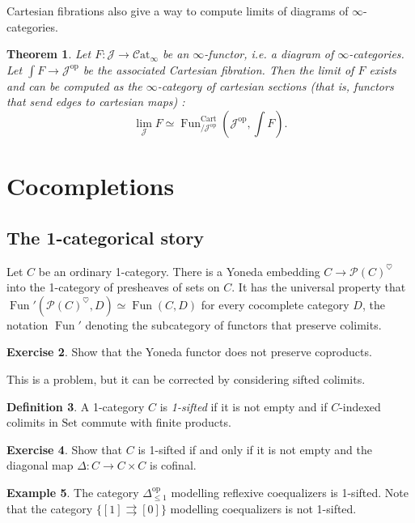 \documentclass[11pt]{article}
\newtheorem{theorem}{Theorem}[section]
\theoremstyle{definition}
\newtheorem{definition}[theorem]{Definition}
\newtheorem{example}[theorem]{Example}
\newtheorem{exercise}[theorem]{Exercise}
\newcommand{\Catinf}{\mathcal{C}\mathrm{at}_{\infty}}
\newcommand{\Fun}{\operatorname{Fun}}
\newcommand{\heart}{\heartsuit}
\newcommand{\J}{\mathcal{J}}
\newcommand{\op}{\mathrm{op}}
\renewcommand{\P}{\mathcal{P}}
\newcommand{\Set}{\mathrm{Set}}
\begin{document}
Cartesian fibrations also give a way to compute limits of diagrams of $\infty$-categories.
\begin{theorem}
    Let $F : \J \to \Catinf$ be an $\infty$-functor, i.e. a diagram of $\infty$-categories.
    Let $\int F \to \J^{\op}$ be the associated Cartesian fibration.
    Then the limit of $F$ exists and can be computed as the $\infty$-category of cartesian sections (that is, functors that send edges to cartesian maps) :
    \[
        \lim_{\J} F \simeq \Fun_{/\J^{\op}}^{\mathrm{Cart}}(\J^{\op}, \int F).
    \]
\end{theorem}

\section{Cocompletions}

\subsection{The 1-categorical story}

Let $C$ be an ordinary 1-category.
There is a Yoneda embedding $C \to \P(C)^{\heart}$ into the 1-category of presheaves of sets on $C$.
It has the universal property that $\Fun'(\P(C)^{\heart}, D) \simeq \Fun(C, D)$ for every cocomplete category $D$, the notation $\Fun'$ denoting the subcategory of functors that preserve colimits.

\begin{exercise}
    Show that the Yoneda functor does not preserve coproducts.
\end{exercise}

This is a problem, but it can be corrected by considering sifted colimits.
\begin{definition}
    A 1-category $C$ is \emph{1-sifted} if it is not empty and if $C$-indexed colimits in $\Set$ commute with finite products.
\end{definition}

\begin{exercise}
    Show that $C$ is 1-sifted if and only if it is not empty and the diagonal map $\Delta : C \to C \times C$ is cofinal.
\end{exercise}

\begin{example}
    The category $\Delta^{\op}_{\leqslant 1}$ modelling reflexive coequalizers is 1-sifted.
    Note that the category $\{[1] \rightrightarrows [0]\}$ modelling coequalizers is not 1-sifted.
\end{example}
\end{document}
